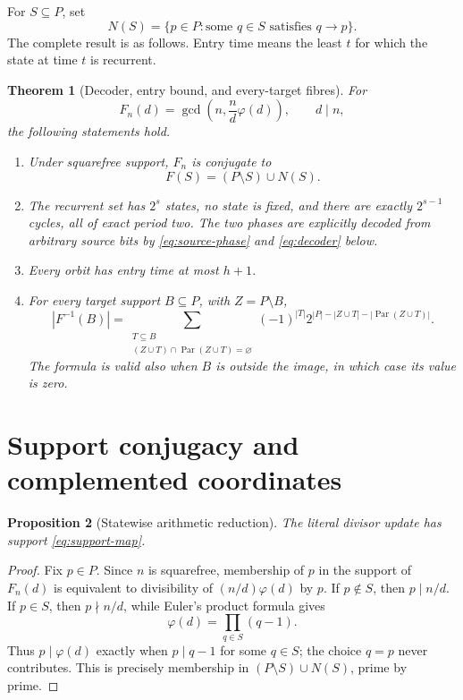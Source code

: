 \documentclass[10pt,a4paper]{amsart}
\newtheorem{theorem}{Theorem}[section]
\newtheorem{proposition}[theorem]{Proposition}
\theoremstyle{definition}
\theoremstyle{remark}
\newcommand{\Par}{\operatorname{Par}}
\newcommand{\ph}{\varphi}
\begin{document}
For $S\subseteq P$, set
\[
 N(S)=\{p\in P:\text{some }q\in S\text{ satisfies }q\to p\}.
\]
The complete result is as follows.  Entry time means the least $t$ for which
the state at time $t$ is recurrent.

\begin{theorem}[Decoder, entry bound, and every-target fibres]\label{thm:main}
For
\[
                 F_n(d)=\gcd\!\left(n,\frac nd\ph(d)\right),\qquad d\mid n,
\]
the following statements hold.
\begin{enumerate}[label=\textup{(\roman*)}]
\item Under squarefree support, $F_n$ is conjugate to
\begin{equation}\label{eq:support-map}
                        F(S)=(P\setminus S)\cup N(S).
\end{equation}
\item The recurrent set has $2^s$ states, no state is fixed, and there are
exactly $2^{s-1}$ cycles, all of exact period two.  The two phases are
explicitly decoded from arbitrary source bits by \eqref{eq:source-phase}
and \eqref{eq:decoder} below.
\item Every orbit has entry time at most $h+1$.
\item For every target support $B\subseteq P$, with $Z=P\setminus B$,
\begin{equation}\label{eq:fibre-main}
 |F^{-1}(B)|=
 \sum_{\substack{T\subseteq B\\
 (Z\cup T)\cap\Par(Z\cup T)=\varnothing}}
 (-1)^{|T|}
 2^{|P|-|Z\cup T|-|\Par(Z\cup T)|}.
\end{equation}
The formula is valid also when $B$ is outside the image, in which case its
value is zero.
\end{enumerate}
\end{theorem}

\section{Support conjugacy and complemented coordinates}

\begin{proposition}[Statewise arithmetic reduction]\label{prop:conjugacy}
The literal divisor update has support \eqref{eq:support-map}.
\end{proposition}

\begin{proof}
Fix $p\in P$.  Since $n$ is squarefree, membership of $p$ in the support of
$F_n(d)$ is equivalent to divisibility of $(n/d)\ph(d)$ by $p$.  If
$p\notin S$, then $p\mid n/d$.  If $p\in S$, then $p\nmid n/d$, while
Euler's product formula gives
\[
                              \ph(d)=\prod_{q\in S}(q-1).
\]
Thus $p\mid\ph(d)$ exactly when $p\mid q-1$ for some $q\in S$; the choice
$q=p$ never contributes.  This is precisely membership in
$(P\setminus S)\cup N(S)$, prime by prime.
\end{proof}
\end{document}
